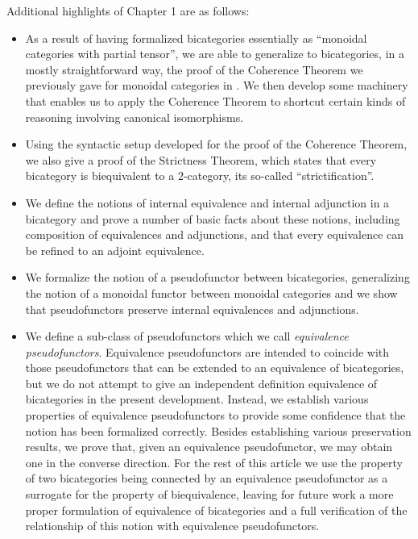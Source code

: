 \documentclass[11pt,notitlepage,a4paper]{report}
\begin{document}
Additional highlights of Chapter 1 are as follows:
\begin{itemize}
\item  As a result of having formalized bicategories essentially as ``monoidal categories with
  partial tensor'', we are able to generalize to bicategories, in a mostly straightforward way,
  the proof of the Coherence Theorem we previously gave for monoidal categories in
  \cite{MonoidalCategory-AFP}.
  We then develop some machinery that enables us to apply the Coherence Theorem to shortcut
  certain kinds of reasoning involving canonical isomorphisms.
%
\item  Using the syntactic setup developed for the proof of the Coherence Theorem, we also
  give a proof of the Strictness Theorem, which states that every bicategory is biequivalent
  to a $2$-category, its so-called ``strictification''.
%
\item  We define the notions of internal equivalence and internal adjunction in a bicategory
  and prove a number of basic facts about these notions, including composition of equivalences
  and adjunctions, and that every equivalence can be refined to an adjoint equivalence.
%
\item  We formalize the notion of a pseudofunctor between bicategories, generalizing the
  notion of a monoidal functor between monoidal categories and we show that pseudofunctors
  preserve internal equivalences and adjunctions.
%
\item  We define a sub-class of pseudofunctors which we call \emph{equivalence pseudofunctors}.
  Equivalence pseudofunctors are intended to coincide with those pseudofunctors that can
  be extended to an equivalence of bicategories, but we do not attempt to give an independent
  definition equivalence of bicategories in the present development.  Instead, we establish various
  properties of equivalence pseudofunctors to provide some confidence that the notion has been
  formalized correctly.  Besides establishing various preservation results, we prove that,
  given an equivalence pseudofunctor, we may obtain one in the converse direction.
  For the rest of this article we use the property of two bicategories being connected by an
  equivalence pseudofunctor as a surrogate for the property of biequivalence,
  leaving for future work a more proper formulation of equivalence of bicategories and a
  full verification of the relationship of this notion with equivalence pseudofunctors.
\end{itemize}
\end{document}
